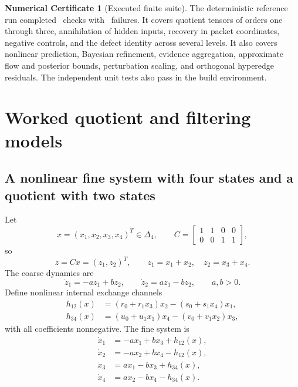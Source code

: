 \documentclass[11pt]{article}
\theoremstyle{definition}
\newtheorem{certificate}[theorem]{Numerical Certificate}
\theoremstyle{remark}
\begin{document}
\begin{certificate}[Executed finite suite]\label{cert:executed-suite}
The deterministic reference run completed \VerificationPassCount\ checks with \VerificationFailCount\ failures.  It covers quotient tensors of orders one through three, annihilation of hidden inputs, recovery in packet coordinates, negative controls, and the defect identity across several levels.  It also covers nonlinear prediction, Bayesian refinement, evidence aggregation, approximate flow and posterior bounds, perturbation scaling, and orthogonal hyperedge residuals.  The independent unit tests also pass in the build environment.
\end{certificate}



\section{Worked quotient and filtering models}\label{sec:examples}

\subsection{A nonlinear fine system with four states and a quotient with two states}
Let
\[
  x=(x_1,x_2,x_3,x_4)^T\in\Delta_4,
  \qquad
  C=
  \begin{bmatrix}
  1&1&0&0\\
  0&0&1&1
  \end{bmatrix},
\]
so
\[
  z=Cx=(z_1,z_2)^T,
  \qquad
  z_1=x_1+x_2,
  \quad
  z_2=x_3+x_4.
\]
The coarse dynamics are
\begin{equation}\label{eq:coarse-two-state}
  \dot z_1=-az_1+bz_2,
  \qquad
  \dot z_2=az_1-bz_2,
  \qquad a,b>0.
\end{equation}
Define nonlinear internal exchange channels
\begin{align}
  h_{12}(x)
  &=
  (r_0+r_1x_3)x_2-(s_0+s_1x_4)x_1,
  \label{eq:h12}\\
  h_{34}(x)
  &=
  (u_0+u_1x_1)x_4-(v_0+v_1x_2)x_3,
  \label{eq:h34}
\end{align}
with all coefficients nonnegative.  The fine system is
\begin{equation}\label{eq:fine-four-state}
\begin{aligned}
  \dot x_1&=-ax_1+bx_3+h_{12}(x),\\
  \dot x_2&=-ax_2+bx_4-h_{12}(x),\\
  \dot x_3&= ax_1-bx_3+h_{34}(x),\\
  \dot x_4&= ax_2-bx_4-h_{34}(x).
\end{aligned}
\end{equation}
\end{document}
